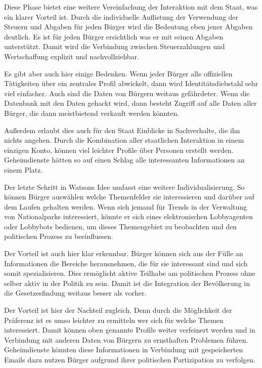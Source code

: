 \documentclass[12pt,twoside,ngerman]{scrartcl}
\theoremstyle{plain}
\theoremstyle{definition}
\theoremstyle{remark}
\begin{document}
	Diese Phase bietet eine weitere Vereinfachung der Interaktion mit dem Staat, was ein klarer Vorteil ist. Durch die individuelle Auflistung der Verwendung der Steuern und Abgaben für jeden Bürger wird die Bedeutung eben jener Abgaben deutlich. Es ist für jeden Bürger ersichtlich was er mit seinen Abgaben unterstützt. Damit wird die Verbindung zwischen Steuerzahlungen und Wertschaffung explizit und nachvollziehbar.
	
	Es gibt aber auch hier einige Bedenken. Wenn jeder Bürger alle offiziellen Tätigkeiten über ein zentrales Profil abwickelt, dann wird Identitätsdiebstahl sehr viel einfacher. Auch sind die Daten von Bürgern weitaus gefährdeter. Wenn die Datenbank mit den Daten gehackt wird, dann besteht Zugriff auf alle Daten aller Bürger, die dann meistbietend verkauft werden könnten. 
	
	Außerdem erlaubt dies auch für den Staat Einblicke in Sachverhalte, die ihn nichts angehen. Durch die Kombination aller staatlichen Interaktion in einem einzigen Konto, können viel leichter Profile über Personen erstellt werden. Geheimdienste hätten so auf einen Schlag alle interessanten Informationen an einem Platz.
	
	Der letzte Schritt in Watsons Idee umfasst eine weitere Individualisierung. So können Bürger auswählen welche Themenfelder sie interessieren und darüber auf dem Laufen gehalten werden. Wenn sich jemand für Trends in der Verwaltung von Nationalparks interessiert, könnte er sich eines elektronischen Lobbyagenten oder Lobbybots bedienen, um dieses Themengebiet zu beobachten und den politischen Prozess zu beeinflussen.
	
	Der Vorteil ist auch hier klar erkennbar. Bürger können sich aus der Fülle an Informationen die Bereiche herausnehmen, die für sie interessant sind und sich somit spezialisieren. Dies ermöglicht aktive Teilhabe am politischen Prozess ohne selber aktiv in der Politik zu sein. Damit ist die Integration der Bevölkerung in die Gesetzesfindung weitaus besser als vorher.
	
	Der Vorteil ist hier der Nachteil zugleich. Denn durch die Möglichkeit der Präferenz ist es umso leichter zu ermitteln wer sich für welche Themen interessiert. Damit können oben genannte Profile weiter verfeinert werden und in Verbindung mit anderen Daten von Bürgern zu ernsthaften Problemen führen. Geheimdienste könnten diese Informationen in Verbindung mit gespeicherten Emails dazu nutzen Bürger aufgrund ihrer politischen Partizipation zu verfolgen. 
	
\end{document}
